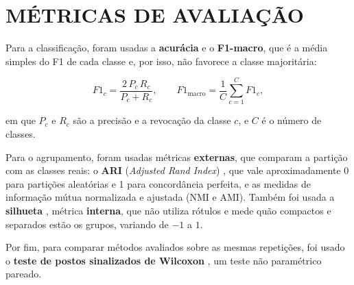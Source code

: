 \section{MÉTRICAS DE AVALIAÇÃO}

Para a classificação, foram usadas a \textbf{acurácia} e o \textbf{F1-macro}, que é a média simples do F1 de cada classe e, por isso, não favorece a classe majoritária:

\begin{equation}
F1_c = \frac{2\,P_c\,R_c}{P_c + R_c}, \qquad F1_{\text{macro}} = \frac{1}{C}\sum_{c=1}^{C} F1_c,
\label{eq:f1}
\end{equation}

\noindent em que $P_c$ e $R_c$ são a precisão e a revocação da classe $c$, e $C$ é o número de classes.

Para o agrupamento, foram usadas métricas \textbf{externas}, que comparam a partição com as classes reais: o \textbf{ARI} (\textit{Adjusted Rand Index}) \citep{hubert1985comparing}, que vale aproximadamente 0 para partições aleatórias e 1 para concordância perfeita, e as medidas de informação mútua normalizada e ajustada (NMI e AMI). Também foi usada a \textbf{silhueta} \citep{rousseeuw1987silhouettes}, métrica \textbf{interna}, que não utiliza rótulos e mede quão compactos e separados estão os grupos, variando de $-1$ a $1$.

Por fim, para comparar métodos avaliados sobre as mesmas repetições, foi usado o \textbf{teste de postos sinalizados de Wilcoxon} \citep{wilcoxon1945individual}, um teste não paramétrico pareado.
